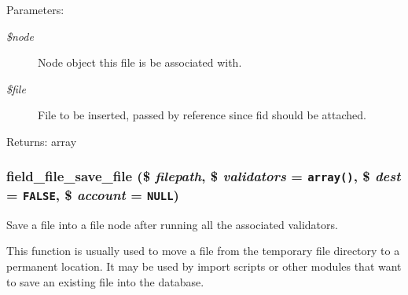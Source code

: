 \begin{Desc}
\item[Parameters:]
\begin{description}
\item[{\em \$node}]Node object this file is be associated with. \item[{\em \$file}]File to be inserted, passed by reference since fid should be attached. \end{description}
\end{Desc}
\begin{Desc}
\item[Returns:]array \end{Desc}
\hypertarget{field__file_8inc_4fd6ba5c832548c4c456e736f6fc25e1}{
\subsubsection[{field\_\-file\_\-save\_\-file}]{\setlength{\rightskip}{0pt plus 5cm}field\_\-file\_\-save\_\-file (\$ {\em filepath}, \/  \$ {\em validators} = {\tt array()}, \/  \$ {\em dest} = {\tt FALSE}, \/  \$ {\em account} = {\tt NULL})}}
\label{field__file_8inc_4fd6ba5c832548c4c456e736f6fc25e1}


Save a file into a file node after running all the associated validators.

This function is usually used to move a file from the temporary file directory to a permanent location. It may be used by import scripts or other modules that want to save an existing file into the database.

